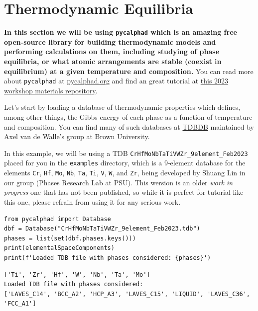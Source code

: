 \section{Thermodynamic Equilibria}\label{nimplextutorial2:thermodynamic-equilibria}

\textbf{In this section we will be using
\texttt{pycalphad} which is an amazing free open-source
library for building thermodynamic models and performing calculations on
them, including studying of phase equilibria, or what atomic
arrangements are stable (coexist in equilibrium) at a given temperature
and composition.} You can read more about
\texttt{pycalphad} at
\href{https://pycalphad.org/}{pycalphad.org} and find an great tutorial
at
\href{https://github.com/materialsgenomefoundation/2023-workshop-material/tree/main/pycalphad}{this
2023 workshop materials repository}.

Let's start by loading a database of thermodynamic properties which
defines, among other things, the Gibbs energy of each phase as a
function of temperature and composition. You can find many of such
databases at \href{https://avdwgroup.engin.brown.edu}{TDBDB} maintained
by Axel van de Walle's group at Brown University.

In this example, we will be using a TDB
\texttt{CrHfMoNbTaTiVWZr\_9element\_Feb2023} placed for
you in the \texttt{examples} directory, which is a
9-element database for the elements \texttt{Cr},
\texttt{Hf}, \texttt{Mo},
\texttt{Nb}, \texttt{Ta},
\texttt{Ti}, \texttt{V},
\texttt{W}, and \texttt{Zr}, being
developed by Shuang Lin in our group (Phases Research Lab at PSU). This
wersion is an older \emph{work in progress} one that has not been
published, so while it is perfect for tutorial like this one, please
refrain from using it for any serious work.

\begin{verbatim}
from pycalphad import Database
dbf = Database("CrHfMoNbTaTiVWZr_9element_Feb2023.tdb")
phases = list(set(dbf.phases.keys()))
print(elementalSpaceComponents)
print(f'Loaded TDB file with phases considered: {phases}')
\end{verbatim}

\begin{verbatim}
['Ti', 'Zr', 'Hf', 'W', 'Nb', 'Ta', 'Mo']
Loaded TDB file with phases considered: 
['LAVES_C14', 'BCC_A2', 'HCP_A3', 'LAVES_C15', 'LIQUID', 'LAVES_C36', 'FCC_A1']
\end{verbatim}

